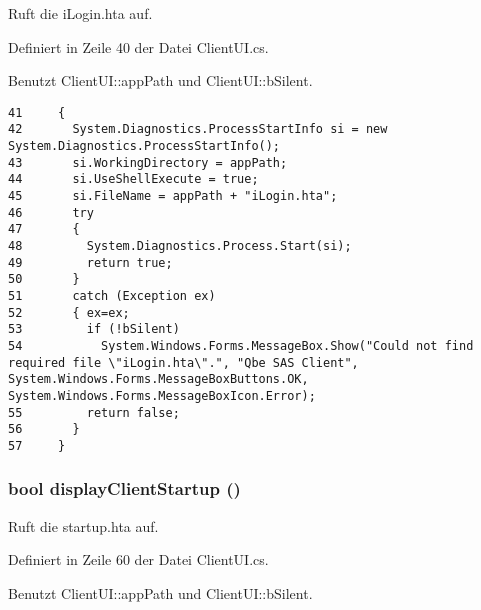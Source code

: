 Ruft die i\-Login.hta auf. 



Definiert in Zeile 40 der Datei Client\-UI.cs.

Benutzt Client\-UI::app\-Path und Client\-UI::b\-Silent.



\footnotesize\begin{verbatim}41     {
42       System.Diagnostics.ProcessStartInfo si = new System.Diagnostics.ProcessStartInfo();
43       si.WorkingDirectory = appPath;
44       si.UseShellExecute = true;
45       si.FileName = appPath + "iLogin.hta";
46       try 
47       {
48         System.Diagnostics.Process.Start(si);
49         return true;
50       } 
51       catch (Exception ex)
52       { ex=ex;
53         if (!bSilent)
54           System.Windows.Forms.MessageBox.Show("Could not find required file \"iLogin.hta\".", "Qbe SAS Client", System.Windows.Forms.MessageBoxButtons.OK, System.Windows.Forms.MessageBoxIcon.Error);
55         return false;
56       }
57     }
\end{verbatim}\normalsize 
\hypertarget{classQbeSAS_1_1ClientUI_QbeSAS_1_1ClientUIa3}{
\subsubsection[displayClientStartup]{\setlength{\rightskip}{0pt plus 5cm}bool display\-Client\-Startup ()}}
\label{classQbeSAS_1_1ClientUI_QbeSAS_1_1ClientUIa3}


Ruft die startup.hta auf. 



Definiert in Zeile 60 der Datei Client\-UI.cs.

Benutzt Client\-UI::app\-Path und Client\-UI::b\-Silent.



